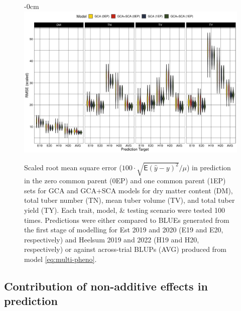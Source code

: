 \begin{figure}[H]
\begin{adjustwidth}{-\extralength}{0cm}
\centering
\includegraphics[width=15.5cm]{figs_03/fig-rmsd-1.pdf}
\end{adjustwidth}
\caption{\label{fig:rmsd}Scaled root mean square error (\(100\cdot\sqrt{\mathsf{E}(\hat{y}- y)^2}/\mu\)) in prediction in the zero common parent (0EP) and one common parent (1EP) sets for GCA and GCA+SCA models for dry matter content (DM), total tuber number (TN), mean tuber volume (TV), and total tuber yield (TY). Each trait, model, \& testing scenario were tested 100 times. Predictions were either compared to BLUEs generated from the first stage of modelling for Est 2019 and 2020 (E19 and E20, respectively) and Heelsum 2019 and 2022 (H19 and H20, respectively) or against across-trial BLUPs (AVG) produced from model \ref{eq:multi-pheno}.}
\end{figure}

\subsection{Contribution of non-additive effects in prediction}


